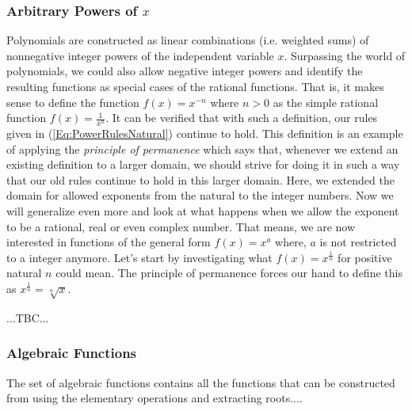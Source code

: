 \subsubsection{Arbitrary Powers of $x$}
Polynomials are constructed as linear combinations (i.e. weighted sums) of nonnegative integer powers of the independent variable $x$. Surpassing the world of polynomials, we could also allow negative integer powers and identify the resulting functions as special cases of the rational functions. That is, it makes sense to define the function $f(x) = x^{-n}$ where $n > 0$ as the simple rational function $f(x) = \frac{1}{x^n}$. It can be verified that with such a definition, our rules given in (\ref{Eq:PowerRulesNatural}) continue to hold. This definition is an example of applying the \emph{principle of permanence} which says that, whenever we extend an existing definition to a larger domain, we should strive for doing it in such a way that our old rules continue to hold in this larger domain. Here, we extended the domain for allowed exponents from the natural to the integer numbers. Now we will generalize even more and look at what happens when we allow the exponent to be a rational, real or even complex number. That means, we are now interested in functions of the general form $f(x) = x^a$ where, $a$ is not restricted to a integer anymore. Let's start by investigating what $f(x) = x^{\frac{1}{n}}$ for positive natural $n$ could mean. The principle of permanence forces our hand to define this as $x^{\frac{1}{n}} = \sqrt[n]{x}$.

...TBC...



%






\subsubsection{Algebraic Functions}
The set of algebraic functions contains all the functions that can be constructed from using the elementary operations and extracting roots....








